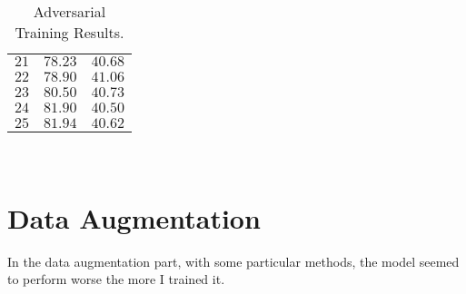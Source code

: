 \documentclass[11pt, reqno]{amsart}
\begin{document}
\begin{table}[h]
\begin{tabular}{| r | r | r |}
      $21$                        & $78.23$                 & $40.68$ \\
      $22$                        & $78.90$                 & $41.06$ \\
      $23$                        & $80.50$                 & $40.73$ \\
      $24$                        & $81.90$                 & $40.50$ \\
      $25$                        & $81.94$                 & $40.62$ \\
    \toprule
  \end{tabular}
  \caption{Adversarial Training Results.}~\label{tab:results}
\end{table}


\pagebreak
\section{Data Augmentation}

In the data augmentation part, with some particular methods,
the model seemed to perform worse the more I trained it.


\end{document}

